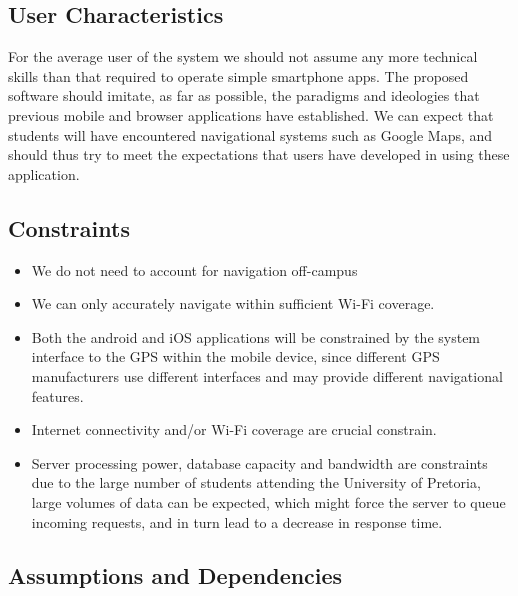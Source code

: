 \documentclass[12pt,a4paper]{article}
\begin{document}
		\subsection{User Characteristics}

			For the average user of the system we should not assume any more technical
			skills than that required to operate simple smartphone apps. The proposed
			software should imitate, as far as possible, the paradigms and ideologies
			that previous mobile and browser applications have established. We can
			expect that students will have encountered navigational systems such as
			Google Maps, and should thus try to meet the expectations that users have
			developed in using these application.

		\subsection{Constraints}

			\begin{itemize}

				\item We do not need to account for navigation off-campus
				\item We can only accurately navigate within sufficient Wi-Fi coverage.
				\item Both the android and iOS applications will be constrained by the system 
				interface to the GPS within the mobile device, since different GPS manufacturers 
				use different interfaces and may provide different navigational features.
				\item Internet connectivity and/or Wi-Fi coverage are crucial constrain.
				\item Server processing power, database capacity and bandwidth are constraints 
				due to the large number of students attending the University of Pretoria, large 
				volumes of data can be expected, which might force the server to queue incoming 
				requests, and in turn lead to a decrease in response time.

			\end{itemize}

		\subsection{Assumptions and Dependencies}
		
\end{document}
